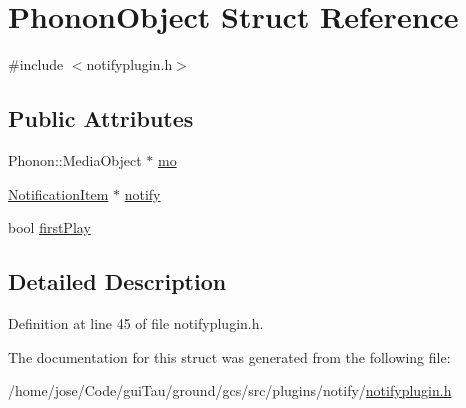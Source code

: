 \hypertarget{struct_phonon_object}{\section{Phonon\-Object Struct Reference}
\label{struct_phonon_object}
}


{\ttfamily \#include $<$notifyplugin.\-h$>$}

\subsection*{Public Attributes}
\begin{DoxyCompactItemize}
\item 
Phonon\-::\-Media\-Object $\ast$ \hyperlink{group__notifyplugin_ga3b35d975a7599cd263b275559734e54d}{mo}
\item 
\hyperlink{class_notification_item}{Notification\-Item} $\ast$ \hyperlink{group__notifyplugin_ga82a15e7062562dabd14047b2e5398889}{notify}
\item 
bool \hyperlink{group__notifyplugin_ga86b5c4ceede5297e656149cd1f1af3fe}{first\-Play}
\end{DoxyCompactItemize}


\subsection{Detailed Description}


Definition at line 45 of file notifyplugin.\-h.



The documentation for this struct was generated from the following file\-:\begin{DoxyCompactItemize}
\item 
/home/jose/\-Code/gui\-Tau/ground/gcs/src/plugins/notify/\hyperlink{notifyplugin_8h}{notifyplugin.\-h}\end{DoxyCompactItemize}
